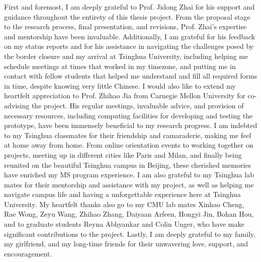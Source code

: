 
\begin{acknowledgements}

First and foremost, I am deeply grateful to Prof. Jidong Zhai for his support and guidance throughout the entirety of this thesis project. From the proposal stage to the research process, final presentation, and revisions, Prof. Zhai's expertise and mentorship have been invaluable. Additionally, I am grateful for his feedback on my status reports and for his assistance in navigating the challenges posed by the border closure and my arrival at Tsinghua University, including helping me schedule meetings at times that worked in my timezone, and putting me in contact with fellow students that helped me understand and fill all required forms in time, despite knowing very little Chinese. I would also like to extend my heartfelt appreciation to Prof. Zhihao Jia from Carnegie Mellon University for co-advising the \Project project. His regular meetings, invaluable advice, and provision of necessary resources, including computing facilities for developing and testing the \Project prototype, have been immensely beneficial to my research progress. I am indebted to my Tsinghua classmates for their friendship and camaraderie, making me feel at home away from home. From online orientation events to working together on projects, meeting up in different cities like Paris and Milan, and finally being reunited on the beautiful Tsinghua campus in Beijing, these cherished memories have enriched my MS program experience. I am also grateful to my Tsinghua lab mates for their mentorship and assistance with my project, as well as helping me navigate campus life and having a unforgettable experience here at Tsinghua University. My heartfelt thanks also go to my CMU lab mates Xinhao Cheng, Rae Wong, Zeyu Wang, Zhihao Zhang, Daiyaan Arfeen, Hongyi Jin, Bohan Hou, and to graduate students Reyna Abhyankar and Colin Unger, who have make significant contributions to the project. Lastly, I am deeply grateful to my family, my girlfriend, and my long-time friends for their unwavering love, support, and encouragement.

\end{acknowledgements}
